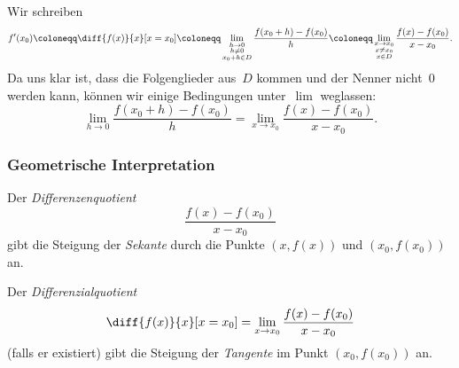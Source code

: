\documentclass[a4paper]{article}
\begin{document}
\begin{notation}
    Wir schreiben
    \begin{equation*}
        f'(x_0) \coloneqq \diff{f(x)}{x}[x=x_0] \coloneqq \lim_{\substack{h\to0\\ h\neq0\\ x_0+h\in D}} \frac{f(x_0+h)-f(x_0)}{h} \coloneqq \lim_{\substack{x\to x_0\\ x\neq x_0\\ x\in D}} \frac{f(x)-f(x_0)}{x-x_0}.
    \end{equation*}
    Da uns klar ist, dass die Folgenglieder aus~$D$ kommen und der Nenner nicht~0 werden kann, können wir einige Bedingungen unter~$\lim$ weglassen:
    \begin{equation*}
        \lim_{h\to0} \frac{f(x_0+h)-f(x_0)}{h} = \lim_{x\to x_0} \frac{f(x)-f(x_0)}{x-x_0}.
    \end{equation*}
\end{notation}

\subsubsection{Geometrische Interpretation}

Der \emph{Differenzenquotient}
\begin{equation*}
    \frac{f(x)-f(x_0)}{x-x_0}
\end{equation*}
gibt die Steigung der \emph{Sekante} durch die Punkte $(x,f(x))$ und $(x_0,f(x_0))$ an.

Der \emph{Differenzialquotient}
\begin{equation*}
    \diff{f(x)}{x}[x=x_0] = \lim_{x\to x_0} \frac{f(x)-f(x_0)}{x-x_0}
\end{equation*}
(falls er existiert) gibt die Steigung der \emph{Tangente} im Punkt $(x_0,f(x_0))$ an.

\begin{center}
\end{center}
\end{document}
